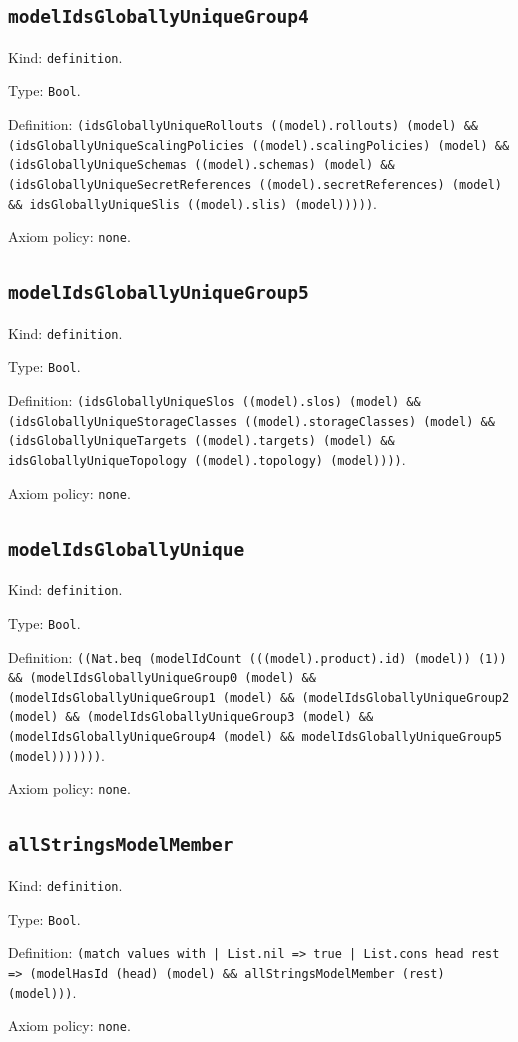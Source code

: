 \documentclass[11pt]{article}
\begin{document}
\subsection*{\texttt{modelIdsGloballyUniqueGroup4}}
\noindent Kind: \texttt{definition}.\par
\noindent Type: \texttt{Bool}.\par
\noindent Definition: \texttt{(idsGloballyUniqueRollouts ((model).rollouts) (model) \&\& (idsGloballyUniqueScalingPolicies ((model).scalingPolicies) (model) \&\& (idsGloballyUniqueSchemas ((model).schemas) (model) \&\& (idsGloballyUniqueSecretReferences ((model).secretReferences) (model) \&\& idsGloballyUniqueSlis ((model).slis) (model)))))}.\par
\noindent Axiom policy: \texttt{none}.\par
\subsection*{\texttt{modelIdsGloballyUniqueGroup5}}
\noindent Kind: \texttt{definition}.\par
\noindent Type: \texttt{Bool}.\par
\noindent Definition: \texttt{(idsGloballyUniqueSlos ((model).slos) (model) \&\& (idsGloballyUniqueStorageClasses ((model).storageClasses) (model) \&\& (idsGloballyUniqueTargets ((model).targets) (model) \&\& idsGloballyUniqueTopology ((model).topology) (model))))}.\par
\noindent Axiom policy: \texttt{none}.\par
\subsection*{\texttt{modelIdsGloballyUnique}}
\noindent Kind: \texttt{definition}.\par
\noindent Type: \texttt{Bool}.\par
\noindent Definition: \texttt{((Nat.beq (modelIdCount (((model).product).id) (model)) (1)) \&\& (modelIdsGloballyUniqueGroup0 (model) \&\& (modelIdsGloballyUniqueGroup1 (model) \&\& (modelIdsGloballyUniqueGroup2 (model) \&\& (modelIdsGloballyUniqueGroup3 (model) \&\& (modelIdsGloballyUniqueGroup4 (model) \&\& modelIdsGloballyUniqueGroup5 (model)))))))}.\par
\noindent Axiom policy: \texttt{none}.\par
\subsection*{\texttt{allStringsModelMember}}
\noindent Kind: \texttt{definition}.\par
\noindent Type: \texttt{Bool}.\par
\noindent Definition: \texttt{(match values with | List.nil => true | List.cons head rest => (modelHasId (head) (model) \&\& allStringsModelMember (rest) (model)))}.\par
\noindent Axiom policy: \texttt{none}.\par
\end{document}
